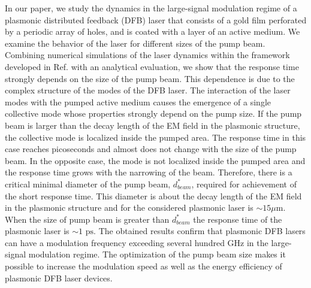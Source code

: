\documentclass[aps,pra,amsmath,amssymb,onecolumn,superscriptaddress,showpacs,floatfix,]{revtex4-1}
\begin{document}
In our paper, we study the dynamics in the large-signal modulation regime of a plasmonic distributed feedback (DFB) laser that consists of a gold film perforated by a periodic array of holes, and is coated with a layer of an active medium.
We examine the behavior of the laser for different sizes of the pump beam.
Combining numerical simulations of the laser dynamics within the framework developed in Ref. \cite{Zyablovsky2017approach,nefedkin2018acsphot} with an analytical evaluation, we show that the response time strongly depends on the size of the pump beam.
This dependence is due to the complex structure of the modes of the DFB laser.
The interaction of the laser modes with the pumped active medium causes the emergence of a single collective mode whose properties strongly depend on the pump size.
If the pump beam is larger than the decay length of the EM field in the plasmonic structure, the collective mode is localized inside the pumped area.
The response time in this case reaches picoseconds and almost does not change with the size of the pump beam.
In the opposite case, the mode is not localized inside the pumped area and the response time grows with the narrowing of the beam.
Therefore, there is a critical minimal diameter of the pump beam, $d_{beam}^*$, required for achievement of the short response time. This diameter is about the decay length of the EM field in the plasmonic structure and for the considered plasmonic laser is $\sim 15 \mu$m. When the size of pump beam is greater than $d_{beam}^*$ the response time of the plasmonic laser is $\sim 1$ $\text{ps}$.
The obtained results confirm that plasmonic DFB lasers can have a modulation frequency exceeding several hundred GHz in the large-signal modulation regime. The optimization of the pump beam size makes it possible to increase the modulation speed as well as the energy efficiency of plasmonic DFB laser devices.
\end{document}
